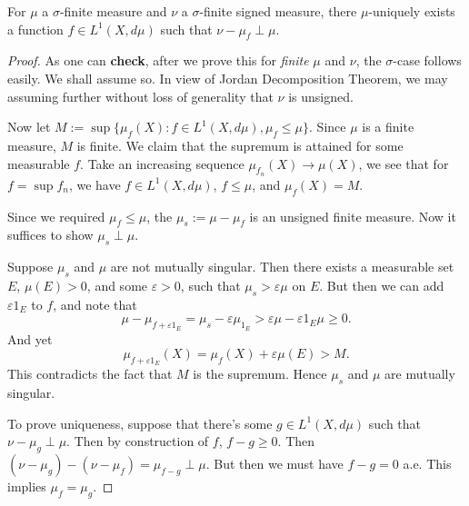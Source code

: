 \begin{lemma}
	For $\mu$ a $\sigma$-finite measure and $\nu$ a $\sigma$-finite signed measure, there $\mu$-uniquely exists a function $f \in L^1(X, d \mu)$ such that $\nu - \mu_f \perp \mu$.
\end{lemma}
\begin{proof}
	As one can \textbf{check}, after we prove this for \textit{finite} $\mu$ and $\nu$, the $\sigma$-case follows easily. We shall assume so. In view of Jordan Decomposition Theorem, we may assuming further without loss of generality that  $\nu$ is unsigned.

	Now let  $M := \sup \{\mu_f(X) :  f \in L^1(X, d \mu), \mu_f \le \mu\} $. Since $\mu$ is a finite measure, $M$ is finite. We claim that the supremum is attained for some measurable $f$. Take an increasing sequence $\mu_{f_n}(X) \to \mu(X)$, we see that for $f = \sup f_n$, we have $f \in L^1(X, d \mu)$, $f \le  \mu$, and $\mu_f(X) = M$.

	Since we required $\mu_f \le \mu$, the $\mu_s := \mu - \mu_f$ is an unsigned finite measure. Now it suffices to show $\mu_s \perp \mu$.

	Suppose $\mu_s$ and $\mu$ are not mutually singular. Then there exists a measurable set $E$, $\mu(E) > 0$, and some $\varepsilon>0$, such that $\mu_s > \varepsilon \mu$ on $E$. But then we can add $\varepsilon1_E$ to $f$, and note that
	\[
		\mu - \mu_{f + \varepsilon1_E} = \mu_s - \varepsilon \mu_{1_E} > \varepsilon \mu - \varepsilon 1_E \mu \ge 0
	.\] 
	And yet
	\[
		\mu_{f + \varepsilon 1_E} (X) = \mu_f\left(X \right) + \varepsilon \mu(E) > M 
	.\] 
	This contradicts the fact that $M $ is the supremum. Hence $\mu_s$ and $\mu$ are mutually singular.

	To prove uniqueness, suppose that there's some $g \in L^1(X, d\mu)$ such that $\nu - \mu_g \perp \mu$. Then by construction of $f$, $f - g\ge 0$. Then $(\nu - \mu_g) - (\nu - \mu_f) = \mu_{f - g} \perp \mu$. But then we must have $f - g = 0$ a.e. This implies $\mu_f = \mu_g$.
\end{proof}


